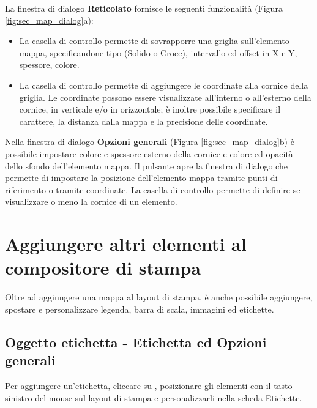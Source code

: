 
La finestra di dialogo \textbf{Reticolato} fornisce le seguenti funzionalità
(Figura \ref{fig:sec_map_dialog}a):

\begin{itemize}[label=--]
\item La casella di controllo  permette di sovrapporre una griglia
sull'elemento mappa, specificandone tipo (Solido o Croce), intervallo ed offset in X e Y, spessore, 
colore.
\item La casella di controllo  permette di aggiungere
le coordinate alla cornice della griglia. Le coordinate possono essere visualizzate all'interno o 
all'esterno della cornice, in verticale e/o in orizzontale; è inoltre possibile specificare il carattere,
la distanza dalla mappa e la precisione delle coordinate.
\end{itemize}


Nella finestra di dialogo \textbf{Opzioni generali} (Figura \ref{fig:sec_map_dialog}b) è possibile impostare colore e spessore esterno della cornice e colore ed opacità
dello sfondo dell'elemento mappa. Il pulsante  apre la finestra di 
dialogo  che permette di impostare la posizione dell'elemento mappa
tramite punti di riferimento o tramite coordinate.
La casella di controllo  permette di definire se visualizzare o 
meno la cornice di un elemento.

\section{Aggiungere altri elementi al compositore di stampa} 

Oltre ad aggiungere una mappa al layout di stampa, è anche possibile
aggiungere, spostare e personalizzare legenda, barra di scala, immagini ed 
etichette.

\subsection{Oggetto etichetta - Etichetta ed Opzioni generali}

Per aggiungere un'etichetta, cliccare su , 
posizionare gli elementi con il tasto sinistro del mouse sul layout di stampa e personalizzarli 
nella scheda Etichette.

